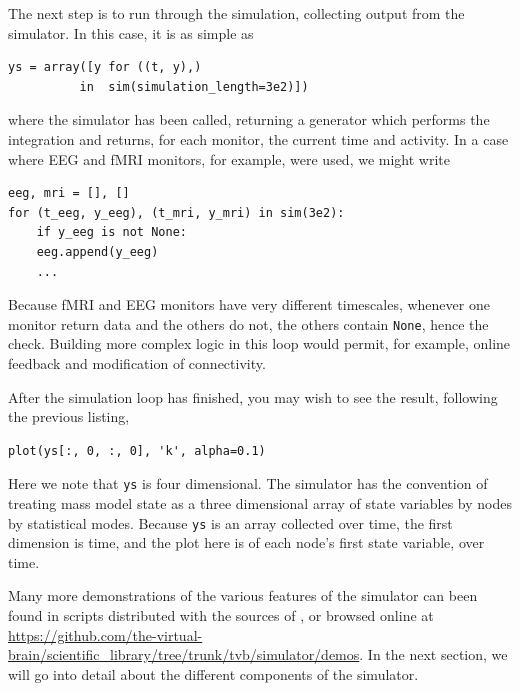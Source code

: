The next step is to run through the simulation, collecting
output from the simulator. In this case, it is as simple as
\begin{lstlisting}
ys = array([y for ((t, y),) 
	      in  sim(simulation_length=3e2)])
\end{lstlisting}
\noindent where the simulator has been called, returning a 
generator which performs the integration and returns, for each
monitor, the current time and activity. In a case where EEG 
and fMRI monitors, for example, were used, we might write
\begin{lstlisting}
eeg, mri = [], []
for (t_eeg, y_eeg), (t_mri, y_mri) in sim(3e2):
    if y_eeg is not None:
	eeg.append(y_eeg)
    ...
\end{lstlisting}
\noindent Because fMRI and EEG monitors have very different
timescales, whenever one monitor return data and the others do
not, the others contain \texttt{None}, hence the check. Building
more complex logic in this loop would permit, for example, online
feedback and modification of connectivity. 

After the simulation loop has finished, you may wish to see the
result, following the previous listing, 
\begin{lstlisting}
plot(ys[:, 0, :, 0], 'k', alpha=0.1)
\end{lstlisting}
\noindent Here we note that \texttt{ys} is four dimensional. The 
simulator has the convention of treating  mass model state as a
three dimensional array of state variables by nodes by statistical
modes. Because \texttt{ys} is an array collected over time, the first
dimension is time, and the plot here is of each node's first state
variable, over time.

Many more demonstrations of the various features of the simulator
can been found in scripts distributed with the sources of \TVB, or 
browsed online at \url{https://github.com/the-virtual-brain/scientific_library/tree/trunk/tvb/simulator/demos}.
In the next section, we will go into detail about the different
components of the simulator.

